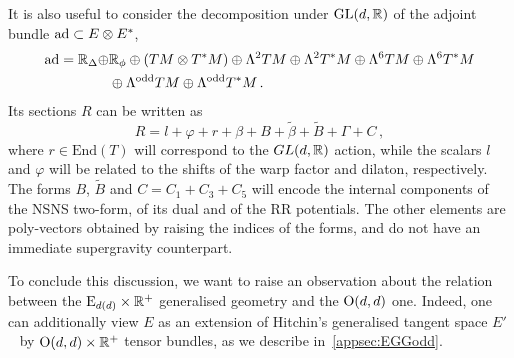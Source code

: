 \documentclass[debug]{phd}
\begin{document}
					It is also useful to consider the decomposition under $\mathrm{GL}(d,\mathbb{R})$ of the adjoint bundle $\operatorname{ad} \subset E \otimes E^*$, 
							\begin{equation}\label{decomp_adjoint}
								\begin{split}
									\operatorname{ad} = 	\mathbb{R}_\Delta \oplus& \mathbb{R}_\phi \oplus (TM\otimes T^*M) \oplus \Lambda^2 TM \oplus \Lambda^2 T^*M \oplus \Lambda^6 TM \oplus \Lambda^6 T^*M \\
											& \oplus \Lambda^{\mathrm{odd}} TM \oplus \Lambda^{\text{odd}} T^*M \, .
								\end{split}
							\end{equation}
					Its sections $R$ can be written as 
							\begin{equation}\label{section_adjoint}
								R = l + \varphi + r + \beta + B + \tilde \beta + \tilde B + \Gamma + C \, ,
							\end{equation} 
where $r \in \mathrm{End}(T)$ will correspond to the $GL(d,\mathbb{R})$ action, while the scalars $l$ and $\varphi$ will be related to the shifts of the warp factor and dilaton, respectively. 
					The forms $B$, $\tilde B$ and $C = C_1 + C_3 + C_5$ will encode the internal components of the NSNS two-form, of its dual and of the RR potentials.
					The other elements are poly-vectors obtained by raising the indices of the forms, and do not have an immediate supergravity counterpart.
					
										
					
					To conclude this discussion, we want to raise an observation about the relation between the $\mathrm{E}_{d(d)} \times \mathbb{R}^+$ generalised geometry and the $\mathrm{O}(d,d)$ one.
					Indeed, one can additionally view $E$ as an extension of Hitchin's generalised tangent space $E'$~\cite{hitch1,gualtphd} by $\mathrm{O}(d,d)\times\mathbb{R}^+$ tensor bundles, as we describe in~\cref{appsec:EGGodd}.
\end{document}

